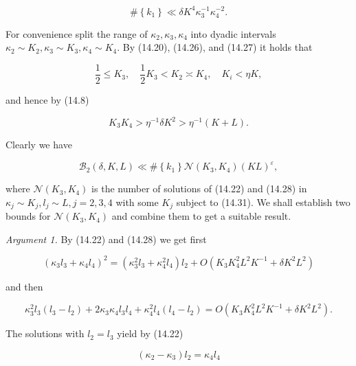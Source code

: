 \documentclass[10pt]{article}
\begin{document}
\begin{equation*}
\#\left\{k_{1}\right\}\ll\delta K^{4} \kappa_{3}^{-1} \kappa_{4}^{-2} . \tag{14.30}
\end{equation*}


For convenience split the range of $\kappa_{2}, \kappa_{3}, \kappa_{4}$ into dyadic intervals $\kappa_{2} \sim K_{2}, \kappa_{3} \sim K_{3}, \kappa_{4} \sim K_{4}$. By (14.20), (14.26), and (14.27) it holds that


\begin{equation*}
\frac{1}{2} \leqslant K_{3}, \quad \frac{1}{2} K_{3}<K_{2} \asymp K_{4}, \quad K_{i}<\eta K, \tag{14.31}
\end{equation*}


and hence by (14.8)


\begin{equation*}
K_{3} K_{4}>\eta^{-1} \delta K^{2}>\eta^{-1}(K+L) . \tag{14.32}
\end{equation*}


Clearly we have


\begin{equation*}
\mathscr{B}_{2}(\delta,K,L)\ll\#\left\{k_{1}\right\} \mathscr{N}\left(K_{3}, K_{4}\right)(K L)^{\varepsilon}, \tag{14.33}
\end{equation*}


where $\mathscr{N}\left(K_{3}, K_{4}\right)$ is the number of solutions of (14.22) and (14.28) in $\kappa_{j} \sim K_{j}, l_{j} \sim L, j=2,3,4$ with some $K_{j}$ subject to (14.31). We shall establish two bounds for $\mathscr{N}\left(K_{3}, K_{4}\right)$ and combine them to get a suitable result.

\medskip\noindent\textit{Argument 1.} By (14.22) and (14.28) we get first

$$
\left(\kappa_{3} l_{3}+\kappa_{4} l_{4}\right)^{2}=\left(\kappa_{3}^{2} l_{3}+\kappa_{4}^{2} l_{4}\right) l_{2}+O\left(K_{3} K_{4}^{2} L^{2} K^{-1}+\delta K^{2} L^{2}\right)
$$

and then


\begin{equation*}
\kappa_{3}^{2} l_{3}\left(l_{3}-l_{2}\right)+2 \kappa_{3} \kappa_{4} l_{3} l_{4}+\kappa_{4}^{2} l_{4}\left(l_{4}-l_{2}\right)=O\left(K_{3} K_{4}^{2} L^{2} K^{-1}+\delta K^{2} L^{2}\right) . \tag{14.34}
\end{equation*}


The solutions with $l_{2}=l_{3}$ yield by (14.22)

$$
\left(\kappa_{2}-\kappa_{3}\right) l_{2}=\kappa_{4} l_{4}
$$
\end{document}
